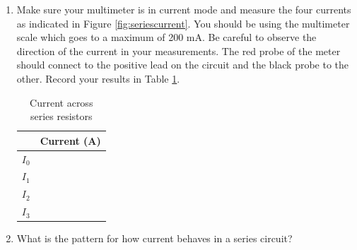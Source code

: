 \begin{enumerate}
	\item Make sure your multimeter is in current mode and measure the four currents as indicated in Figure \ref{fig:seriescurrent}. You should be using the multimeter scale which goes to a maximum of 200 mA. Be careful to observe the direction of the current in your measurements. The red probe of the meter should connect to the positive lead on the circuit and the black probe to the other. Record your results in Table \ref{tab:seriescurrent}.

	\begin{table}
	\begin{center}
	\begin{tabular}{| c | c |}
	\hline
		 & Current (A)\\
		\hline
		$I_0$ &\\
		\hline
		$I_1$ &\\
		\hline
		$I_2$ &\\
		\hline
		$I_3$ &\\
		\hline
	\end{tabular}
	\end{center}
	\caption{Current across series resistors}
	\label{tab:seriescurrent}
	\end{table}

	\item What is the pattern for how current behaves in a series circuit?

\end{enumerate}

